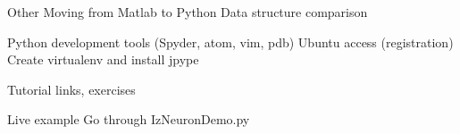 \documentclass[xcolor=x11names, compress]{beamer}
\renewcommand{\(}{\begin{columns}}
\renewcommand{\)}{\end{columns}}
\newcommand{\<}[1]{\begin{column}{#1}}
\renewcommand{\>}{\end{column}}
\begin{document}

\begin{frame}{Other}
  Moving from Matlab to Python
    Data structure comparison

  Python development tools (Spyder, atom, vim, pdb)
    Ubuntu access (registration)
    Create virtualenv and install jpype


  Tutorial links, exercises
\end{frame}
  

\begin{frame}{Live example}
  Go through IzNeuronDemo.py

\end{frame}
\end{document}
